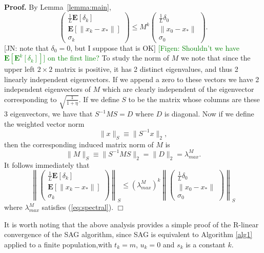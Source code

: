 \documentclass[11pt]{article}
\newcommand{\E}{\mathbf{E}}
\begin{document}
\noindent 
\textbf{Proof.}  By Lemma~\ref{lemma:main},
\begin{equation}
 \begin{pmatrix} \frac{1}{L}\E[\delta_k]\\ \E[\|x_k-x_\ast \|] \\ \sigma_k \end{pmatrix} 
\leq M^k
 \begin{pmatrix} \frac{1}{L}\delta_0 \\ \| x_0-x_\ast \| \\ \sigma_0 \end{pmatrix} .
\end{equation}
{\color{blue} [JN: note that $\delta_0=0$, but I suppose that is OK]} \textcolor{green}{[Figen: Shouldn't we have $\E[\E^k[\delta_k]]$] on the first line?}
To study the norm of $M$ we note that since the upper left $2 \times 2$ matrix is positive, it has 2 distinct eigenvalues, and thus 2 linearly independent eigenvectors. If we append a zero to these vectors we have 2 independent eigenvectors of $M$ which are clearly independent of the eigenvector corresponding to $\sqrt{\frac{1}{1+\eta}}$.  If we define $S$ to be the matrix whose columns are these 3 eigenvectors, we have that $S^{-1}MS =D$ where $D$ is diagonal. Now if we define the weighted vector norm 
\[ \|x\|_S \equiv \|S^{-1}x\|_2 ,  \]
then the corresponding induced matrix norm of $M$ is
\[
\|M\|_S \equiv  \| S^{-1}MS\|_2 = \|D\|_2= \lambda_{max}^M.
\]
It follows immediately that
\begin{equation}\label{rconv}
\left\| \begin{pmatrix} \frac{1}{L}\E[\delta_k]\\ \E[\|x_k-x_\ast \|] \\ \sigma_k \end{pmatrix} \right\|_S
\leq  (\lambda_{max}^M)^k
 \left\| \begin{pmatrix} \frac{1}{L}\delta_0 \\ \| x_0-x_\ast \| \\ \sigma_0 \end{pmatrix} \right\|_S
\end{equation}
where $ \lambda_{max}^M$ satisfies (\ref{eq:spectral}).
\hspace*{\fill}$\Box$\medskip



It is worth noting that the above analysis provides a simple proof of the R-linear convergence of the SAG algorithm, since SAG 
is equivalent to Algorithm \ref{alg1} applied to a finite population,with $t_k =m$, $u_k=0$  and $s_k$ is a constant $k$. 
\end{document}
